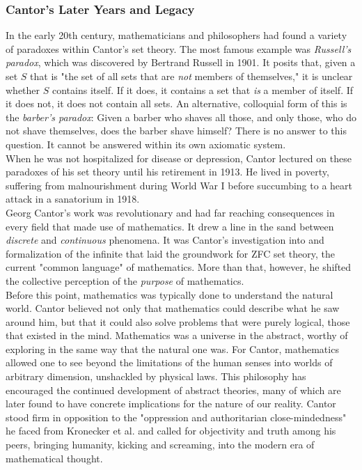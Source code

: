 \subsubsection{Cantor's Later Years and Legacy}

In the early 20th century, mathematicians and philosophers had found a variety of paradoxes within Cantor's set theory. The most famous example was \textit{Russell's paradox}, which was discovered by Bertrand Russell in 1901. It posits that, given a set $S$ that is "the set of all sets that are \textit{not} members of themselves," it is unclear whether $S$ contains itself. If it does, it contains a set that \textit{is} a member of itself. If it does not, it does not contain all sets. An alternative, colloquial form of this is the \textit{barber's paradox}: Given a barber who shaves all those, and only those, who do not shave themselves, does the barber shave himself? There is no answer to this question. It cannot be answered within its own axiomatic system. \\

When he was not hospitalized for disease or depression, Cantor lectured on these paradoxes of his set theory until his retirement in 1913. He lived in poverty, suffering from malnourishment during World War I before succumbing to a heart attack in a sanatorium in 1918. \\

Georg Cantor's work was revolutionary and had far reaching consequences in every field that made use of mathematics. It drew a line in the sand between \textit{discrete} and \textit{continuous} phenomena. It was Cantor's investigation into and formalization of the infinite that laid the groundwork for ZFC set theory, the current "common language" of mathematics. More than that, however, he shifted the collective perception of the \textit{purpose} of mathematics. \\

Before this point, mathematics was typically done to understand the natural world. Cantor believed not only that mathematics could describe what he saw around him, but that it could also solve problems that were purely logical, those that existed in the mind. Mathematics was a universe in the abstract, worthy of exploring in the same way that the natural one was. For Cantor, mathematics allowed one to see beyond the limitations of the human senses into worlds of arbitrary dimension, unshackled by physical laws. This philosophy has encouraged the continued development of abstract theories, many of which are later found to have concrete implications for the nature of our reality. Cantor stood firm in opposition to the "oppression and authoritarian close-mindedness" he faced from Kronecker et al. and called for objectivity and truth among his peers, bringing humanity, kicking and screaming, into the modern era of mathematical thought. \\


